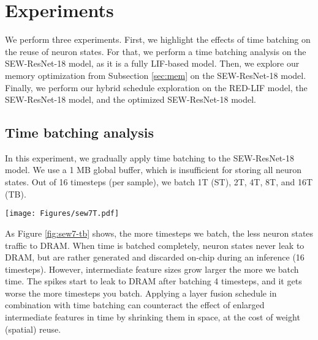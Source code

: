 \section{Experiments} 
\label{sec:experiments}

We perform three experiments. First, we highlight the effects of time batching on the reuse of neuron states. For that, we perform a time batching analysis on the SEW-ResNet-18 model, as it is a fully LIF-based model. Then, we explore our memory optimization from Subsection \ref{sec:mem} on the SEW-ResNet-18 model. Finally, we perform our hybrid schedule exploration on the RED-LIF model, the SEW-ResNet-18 model, and the optimized SEW-ResNet-18 model.

\subsection{Time batching analysis}

 In this experiment, we gradually apply time batching to the SEW-ResNet-18 model. We use a 1 MB global buffer, which is insufficient for storing all neuron states. Out of 16 timesteps (per sample), we batch 1T (ST), 2T, 4T, 8T, and 16T (TB).



\begin{figure*}[!t]
    \centering
    \texttt{[image: Figures/sew7T.pdf]}
    \caption{Effects of time batching on SEW-ResNet-18 model with 1MB on-chip memory; energy breakdown per inference.}
    \label{fig:sew7-tb}
\end{figure*}


As Figure \ref{fig:sew7-tb} shows, the more timesteps we batch, the less neuron states traffic to DRAM. When time is batched completely, neuron states never leak to DRAM, but are rather generated and discarded on-chip during an inference (16 timesteps). However, intermediate feature sizes grow larger the more we batch time. The spikes start to leak to DRAM after batching 4 timesteps, and it gets worse the more timesteps you batch. Applying a layer fusion schedule in combination with time batching can counteract the effect of enlarged intermediate features in time by shrinking them in space, at the cost of weight (spatial) reuse.

